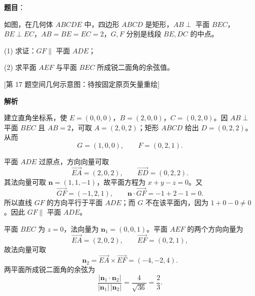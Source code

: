 \begin{answer}

\textbf{题目}：

如图，在几何体 $ABCDE$ 中，四边形 $ABCD$ 是矩形，$AB\perp$ 平面 $BEC$，$BE\perp EC$，$AB=BE=EC=2$，$G,F$ 分别是线段 $BE,DC$ 的中点。

(1) 求证：$GF\parallel$ 平面 $ADE$；

(2) 求平面 $AEF$ 与平面 $BEC$ 所成锐二面角的余弦值。

[第 17 题空间几何示意图：待按固定原页矢量重绘]

\textbf{解析}

建立直角坐标系，使 $E=(0,0,0)$，$B=(2,0,0)$，$C=(0,2,0)$。因 $AB\perp$ 平面 $BEC$ 且 $AB=2$，可取 $A=(2,0,2)$；矩形 $ABCD$ 给出 $D=(0,2,2)$。从而
\nopagebreak[4]
\[
G=(1,0,0),\qquad F=(0,2,1).
\]


平面 $ADE$ 过原点，方向向量可取
\nopagebreak[4]
\[
\overrightarrow{EA}=(2,0,2),\qquad \overrightarrow{ED}=(0,2,2).
\]
其法向量可取 $\boldsymbol n=(1,1,-1)$，故平面方程为 $x+y-z=0$。又
\nopagebreak[4]
\[
\overrightarrow{GF}=(-1,2,1),\qquad
\boldsymbol n\cdot\overrightarrow{GF}=-1+2-1=0.
\]
所以直线 $GF$ 的方向平行于平面 $ADE$；而 $G$ 不在该平面内，因为 $1+0-0\ne0$。因此 $GF\parallel$ 平面 $ADE$。


平面 $BEC$ 为 $z=0$，法向量为 $\boldsymbol n_1=(0,0,1)$。平面 $AEF$ 的两个方向向量为
\nopagebreak[4]
\[
\overrightarrow{EA}=(2,0,2),\qquad \overrightarrow{EF}=(0,2,1),
\]
故法向量可取
\nopagebreak[4]
\[
\boldsymbol n_2=\overrightarrow{EA}\times\overrightarrow{EF}=(-4,-2,4).
\]
两平面所成锐二面角的余弦为
\nopagebreak[4]
\[
\frac{|\boldsymbol n_1\cdot\boldsymbol n_2|}
{|\boldsymbol n_1|\,|\boldsymbol n_2|}
=\frac4{\sqrt{36}}=\frac23.
\]



\end{answer}
